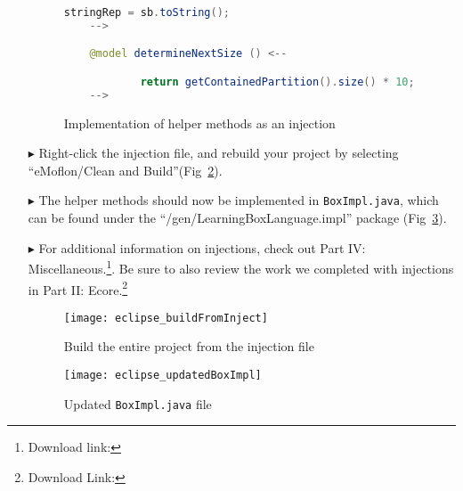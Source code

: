 \begin{itemize}
\begin{figure}[htbp]
\begin{lstlisting}[language=Java, keywordstyle={\bfseries\color{purple}}, backgroundcolor=\color{white}]
            stringRep = sb.toString();
    -->

    @model determineNextSize () <--

            return getContainedPartition().size() * 10;
    -->

        \end{lstlisting}
        \caption{Implementation of helper methods as an injection}
        \label{code:complete_inject_file}
    \end{figure}
    \FloatBarrier

\vspace{0.5cm}

\item[$\blacktriangleright$] Right-click the injection file, and rebuild your project by selecting ``eMoflon/Clean and
Build''(Fig~\ref{fig:eclipse_buildFromInjecton}).

\item[$\blacktriangleright$] The helper methods should now be implemented in \texttt{BoxImpl.java}, which can be found under
the ``/gen/LearningBoxLanguage.impl'' package (Fig~\ref{fig:eclipse_updatedBoxImpl}).

\item[$\blacktriangleright$] For additional information on injections, check out Part IV: Miscellaneous.\footnote{Download link: \dlPartSix}. Be sure to also
review the work we completed with injections in Part II: Ecore.\footnote{Download Link: \dlPartTwo}

\newpage

\vspace*{2cm}

\begin{figure}[htbp]
    \centering
    \texttt{[image: eclipse\_buildFromInject]}
    \caption{Build the entire project from the injection file}
    \label{fig:eclipse_buildFromInjecton}
\end{figure}

\newpage

\vspace*{2cm}

\begin{figure}[htbp]
    \centering
    \texttt{[image: eclipse\_updatedBoxImpl]}
    \caption{Updated \texttt{BoxImpl.java} file}
    \label{fig:eclipse_updatedBoxImpl}
\end{figure}


\end{itemize}

